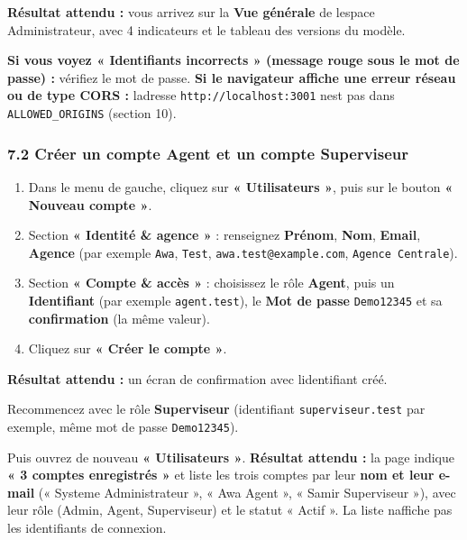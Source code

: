 \documentclass[
  french,
  11pt,
  a4paper,
]{article}
\providecommand{\tightlist}{%
  \setlength{\itemsep}{0pt}\setlength{\parskip}{0pt}}
\begin{document}
\textbf{Résultat attendu :} vous arrivez sur la \textbf{Vue générale} de
l\textquotesingle espace Administrateur, avec 4 indicateurs et le
tableau des versions du modèle.

\textbf{Si vous voyez « Identifiants incorrects » (message rouge sous le
mot de passe) :} vérifiez le mot de passe. \textbf{Si le navigateur
affiche une erreur réseau ou de type CORS :} l\textquotesingle adresse
\texttt{http:/\allowbreak{}/\allowbreak{}localhost:3001}
n\textquotesingle est pas dans \texttt{ALLOWED\_\allowbreak{}ORIGINS}
(section 10).

\subsubsection{7.2 Créer un compte Agent et un compte
Superviseur}\label{72-cruxe9er-un-compte-agent-et-un-compte-superviseur}

\begin{enumerate}
\def\labelenumi{\arabic{enumi}.}
\tightlist
\item
  Dans le menu de gauche, cliquez sur \textbf{« Utilisateurs »}, puis
  sur le bouton \textbf{« Nouveau compte »}.
\item
  Section \textbf{« Identité \& agence »} : renseignez \textbf{Prénom},
  \textbf{Nom}, \textbf{Email}, \textbf{Agence} (par exemple
  \texttt{Awa}, \texttt{Test},
  \texttt{awa.\allowbreak{}test@example.\allowbreak{}com},
  \texttt{Agence\ Centrale}).
\item
  Section \textbf{« Compte \& accès »} : choisissez le rôle
  \textbf{Agent}, puis un \textbf{Identifiant} (par exemple
  \texttt{agent.test}), le \textbf{Mot de passe} \texttt{Demo12345} et
  sa \textbf{confirmation} (la même valeur).
\item
  Cliquez sur \textbf{« Créer le compte »}.
\end{enumerate}

\textbf{Résultat attendu :} un écran de confirmation avec
l\textquotesingle identifiant créé.

Recommencez avec le rôle \textbf{Superviseur} (identifiant
\texttt{superviseur.\allowbreak{}test} par exemple, même mot de passe
\texttt{Demo12345}).

Puis ouvrez de nouveau \textbf{« Utilisateurs »}. \textbf{Résultat
attendu :} la page indique \textbf{« 3 comptes enregistrés »} et liste
les trois comptes par leur \textbf{nom et leur e-mail} (« Systeme
Administrateur », « Awa Agent », « Samir Superviseur »), avec leur rôle
(Admin, Agent, Superviseur) et le statut « Actif ». La liste
n\textquotesingle affiche pas les identifiants de connexion.
\end{document}
